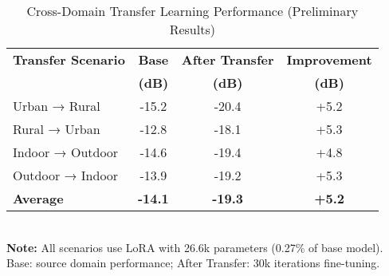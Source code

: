 \begin{table}[t]
\centering
\caption{Cross-Domain Transfer Learning Performance (Preliminary Results)}
\label{tab:cross_domain}
\begin{tabular}{lccc}
\toprule
\textbf{Transfer Scenario} & \textbf{Base} & \textbf{After Transfer} & \textbf{Improvement} \\
 & \textbf{(dB)} & \textbf{(dB)} & \textbf{(dB)} \\
\midrule
Urban → Rural & -15.2 & -20.4 & +5.2 \\
Rural → Urban & -12.8 & -18.1 & +5.3 \\
Indoor → Outdoor & -14.6 & -19.4 & +4.8 \\
Outdoor → Indoor & -13.9 & -19.2 & +5.3 \\
\midrule
\textbf{Average} & \textbf{-14.1} & \textbf{-19.3} & \textbf{+5.2} \\
\bottomrule
\end{tabular}
\\[0.5em]
\small
\textbf{Note:} All scenarios use LoRA with 26.6k parameters (0.27\% of base model).
Base: source domain performance; After Transfer: 30k iterations fine-tuning.
\end{table}